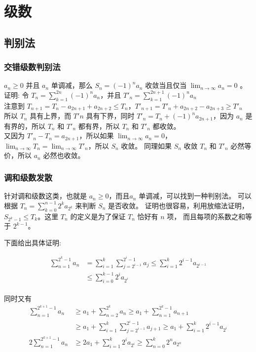 \chapter{级数}

\section{判别法}

\subsection{交错级数判别法}
$a_n \ge 0 $ 并且 $a_n$ 单调减，那么 $S_n = (-1)^na_n$ 收敛当且仅当 $\lim_{n \to \infty}a_n = 0$ 。
证明: 令 $T_n = \sum_{k=1}^{2n}(-1)^na_n$，并且 $T'_n = \sum_{k=1}^{2n+1}(-1)^na_n$ \\
注意到 $T_{n+1} = T_n  - a_{2n+1} + a_{2n+2} \le T_n$，$T'_{n+1} = T'_n  + a_{2n+2} - a_{2n+3} \ge T'_n$ \\
所以 $T_n $ 具有上界，而 $T'n$ 具有下界，同时 $T'_n = T_n + (-1)^na_{2n+1}$，因为 $a_n$ 是有界的，所以 $T_n$ 和 $T'_n$ 都有界，所以
$T_n$ 和 $T'_n$ 都收敛。\\
又因为 $T'_n - T_n = a_{2n+1}$，所以如果 $\lim_{n \to \infty} a_n = 0$，$\lim_{n \to \infty}T_n = \lim_{n \to \infty} T'_n$，所以 $S_n$ 收敛。
同理如果 $S_n$ 收敛 $T_n$ 和 $T'_n$ 必然等价，所以 $a_n$ 必然也收敛。

\subsection{调和级数发散}
针对调和级数这类，也就是 $a_n \ge 0$，而且$a_n$ 单调减，可以找到一种判别法。
可以根据 $T_n = \sum_{k = 0}^{n-1}2^ka_{2^k}$ 来判断 $S_n$ 是否收敛。
证明也很容易，利用放缩法证明，$S_{2^k-1} \le T_k$。这里 $T_n$ 的定义是为了保证 $T_n$ 恰好有 $n$ 项，
而且每项的系数之和等于 $2^{k-1}$。

下面给出具体证明:

\begin{align*}
\sum_{n=1}^{2^k - 1}a_n & = \sum_{i=1}^{k}\sum_{j=2^{i-1}}^{2^i-1}a_j \le \sum_{i=1}^{k}2^{i-1}a_{2^{i-1}} \\
& \le \sum_{i=0}^{k-1}2^ia_{2^i}
\end{align*} \\

同时又有 \\

\begin{align*}
\sum_{n=1}^{2^{k+1}-1}a_n & \ge a_1 + \sum_{n=2}^{2^k}a_n \ge a_1 + \sum_{n=1}^{2^k-1}a_{n+1} \\
 & \ge a_1 + \sum_{i=1}^{k}\sum_{j=2^{i-1}}^{2^i-1}a_{j+1} \ge a_1 + \sum_{i=1}^{k}2^{i-1}a_{2^i} \\
2\sum_{n=1}^{2^{k+1}-1}a_n & \ge 2a_1 + \sum_{i=1}^{k}2^ia_{2^i} \ge \sum_{n=0}^{k}2^na_{2^n}
\end{align*} \\

